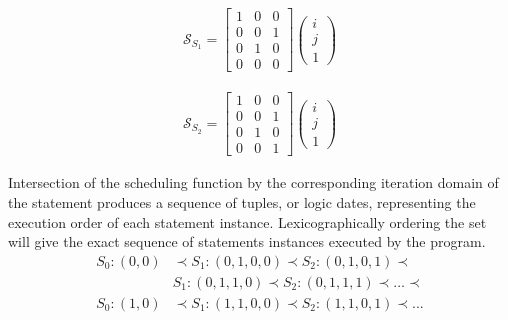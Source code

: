 \begin{align*}
\mathcal{S}_{S_{1}} = \begin{bmatrix} 1 & 0 & 0 \\ 0 & 0 & 1 \\ 
 										0 & 1 & 0 \\ 0 & 0 & 0
 					\end{bmatrix} 
 					\begin{pmatrix} i \\ j \\ 1 \end{pmatrix}  
\end{align*}

\begin{align*}
 \mathcal{S}_{S_{2}} = \begin{bmatrix} 1 & 0 & 0 \\ 0 & 0 & 1 \\ 
 										0 & 1 & 0 \\  0 & 0 & 1 
 					\end{bmatrix} 
					\begin{pmatrix} i \\ j \\ 1 \end{pmatrix}
\end{align*}

Intersection of the scheduling function by the corresponding iteration domain of
the statement produces a sequence of tuples, or logic dates, representing
the execution order of each statement instance. Lexicographically 
ordering the set will give the exact sequence of statements instances executed
by the program. %
\begin{align*}
	S_0:(0,0) & \prec S_1:(0,1,0,0) \prec S_2:(0,1,0,1) \prec \\ 
			  & S_1:(0,1,1,0) \prec S_2:(0,1,1,1) \prec \ldots \prec \\
	S_0:(1,0) & \prec S_1:(1,1,0,0) \prec S_2:(1,1,0,1) \prec ...
\end{align*}


